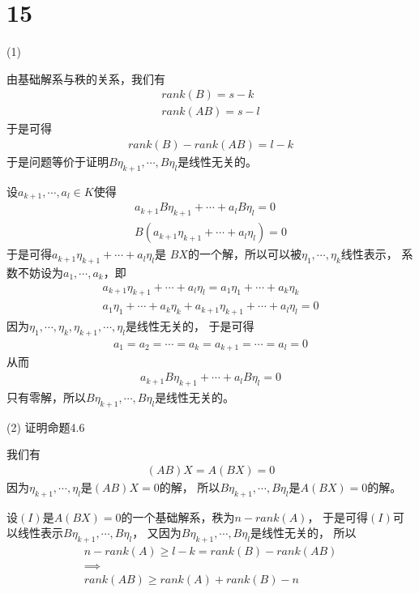 \documentclass{article}
\begin{document}
\section*{15}
 (1)

由基础解系与秩的关系，我们有
\begin{align*}
  rank(B) = s - k \\
  rank(AB) = s - l
\end{align*}
于是可得
\begin{align*}
  rank(B) - rank(AB) = l - k
\end{align*}
于是问题等价于证明$B\eta_{k + 1}, \cdots, B\eta_l$是线性无关的。

设$a_{k+1}, \cdots, a_l \in K$使得
\begin{align*}
  a_{k + 1}B\eta_{k + 1} + \cdots + a_lB\eta_l = 0 \\
  B(a_{k + 1} \eta_{k + 1} + \cdots + a_l \eta_l) = 0
\end{align*}
于是可得$a_{k + 1} \eta_{k + 1} + \cdots + a_l \eta_l$是
$BX$的一个解，所以可以被$\eta_1, \cdots, \eta_k$线性表示，
系数不妨设为$a_1, \cdots, a_k$，即
\begin{align*}
  a_{k + 1} \eta_{k + 1} + \cdots + a_l \eta_l
  = a_1 \eta_1 + \cdots + a_k \eta_k \\
  a_1 \eta_1 + \cdots + a_k \eta_k + a_{k + 1} \eta_{k + 1} + \cdots + a_l \eta_l = 0
\end{align*}
因为$\eta_1, \cdots, \eta_k, \eta_{k + 1}, \cdots, \eta_l$是线性无关的，
于是可得
\begin{align*}
  a_1 = a_2 = \cdots = a_k = a_{k + 1} = \cdots = a_l = 0
\end{align*}
从而
\begin{align*}
  a_{k + 1}B\eta_{k + 1} + \cdots + a_lB\eta_l = 0
\end{align*}
只有零解，所以$B\eta_{k + 1}, \cdots, B\eta_l$是线性无关的。

(2) 证明命题4.6

我们有
\begin{align*}
  (AB)X = A(BX) = 0
\end{align*}
因为$\eta_{k + 1}, \cdots , \eta_l$是$(AB)X = 0$的解，
所以$B\eta_{k + 1}, \cdots, B\eta_l$是$A(BX) = 0$的解。

设$(I)$是$A(BX) = 0$的一个基础解系，秩为$n - rank(A)$，
于是可得$(I)$可以线性表示$B\eta_{k + 1}, \cdots, B\eta_l$，
又因为$B\eta_{k + 1}, \cdots, B\eta_l$是线性无关的，
所以
\begin{align*}
  n - rank(A) \geq l - k = rank(B) - rank(AB) \\
  \implies                                    \\
  rank(AB) \geq rank(A) + rank(B) - n
\end{align*}
\end{document}
